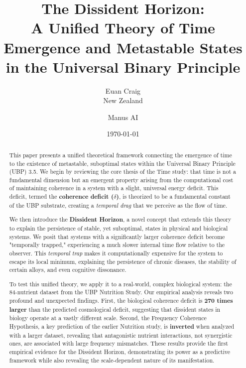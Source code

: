 \documentclass[12pt, a4paper]{article}
\title{
    \textbf{The Dissident Horizon:}
    \\
    \large A Unified Theory of Time Emergence and Metastable States in the Universal Binary Principle
}
\author{Euan Craig \\ \small{New Zealand} \and Manus AI}
\date{\today}
\begin{document}
\maketitle

\begin{abstract}
This paper presents a unified theoretical framework connecting the emergence of time to the existence of metastable, suboptimal states within the Universal Binary Principle (UBP) 3.5. We begin by reviewing the core thesis of the Time study: that time is not a fundamental dimension but an emergent property arising from the computational cost of maintaining coherence in a system with a slight, universal energy deficit. This deficit, termed the \textbf{coherence deficit ($\delta$)}, is theorized to be a fundamental constant of the UBP substrate, creating a \textit{temporal drag} that we perceive as the flow of time.

We then introduce the \textbf{Dissident Horizon}, a novel concept that extends this theory to explain the persistence of stable, yet suboptimal, states in physical and biological systems. We posit that systems with a significantly larger coherence deficit become "temporally trapped," experiencing a much slower internal time flow relative to the observer. This \textit{temporal trap} makes it computationally expensive for the system to escape its local minimum, explaining the persistence of chronic diseases, the stability of certain alloys, and even cognitive dissonance.

To test this unified theory, we apply it to a real-world, complex biological system: the 84-nutrient dataset from the UBP Nutrition Study. Our empirical analysis reveals two profound and unexpected findings. First, the biological coherence deficit is \textbf{270 times larger} than the predicted cosmological deficit, suggesting that dissident states in biology operate at a vastly different scale. Second, the Frequency Coherence Hypothesis, a key prediction of the earlier Nutrition study, is \textbf{inverted} when analyzed with a larger dataset, revealing that antagonistic nutrient interactions, not synergistic ones, are associated with large frequency mismatches. These results provide the first empirical evidence for the Dissident Horizon, demonstrating its power as a predictive framework while also revealing the scale-dependent nature of its manifestation.
\end{abstract}

\newpage

\tableofcontents
\end{document}
